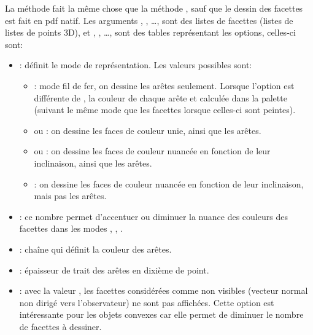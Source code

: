 La méthode  fait la même chose que la méthode , sauf que le dessin des facettes est fait en pdf natif. Les arguments , , \ldots, sont des listes de facettes (listes de listes de points 3D), et , , \ldots, sont des tables représentant les options, celles-ci sont:
\begin{itemize}
    \item {} : définit le mode de représentation. Les valeurs possibles sont:
        \begin{itemize}
            \item {} : mode fil de fer, on dessine les arêtes seulement. Lorsque l'option  est différente de \nil, la couleur de chaque arête et calculée dans la palette (suivant le même mode que les facettes lorsque celles-ci sont peintes).
            
            \item {} ou  : on dessine les faces de couleur unie, ainsi que les arêtes.
            
            \item {} ou  : on dessine les faces de couleur nuancée en fonction de leur inclinaison, ainsi que les arêtes.
            
            \item {} : on dessine les faces de couleur nuancée en fonction de leur inclinaison, mais pas les arêtes.
        \end{itemize}
        
    \item {} : ce nombre permet d'accentuer ou diminuer la nuance des couleurs des facettes dans les modes , , .
    
   
    \item {} : chaîne qui définit la couleur des arêtes.
           
    \item {} : épaisseur de trait des arêtes en dixième de point.
    
    \item {} : avec la valeur \true, les facettes considérées comme non visibles (vecteur normal non dirigé vers l'observateur) ne sont pas affichées. Cette option est intéressante pour les objets convexes car elle permet de diminuer le nombre de facettes à dessiner.
    

\end{itemize}
